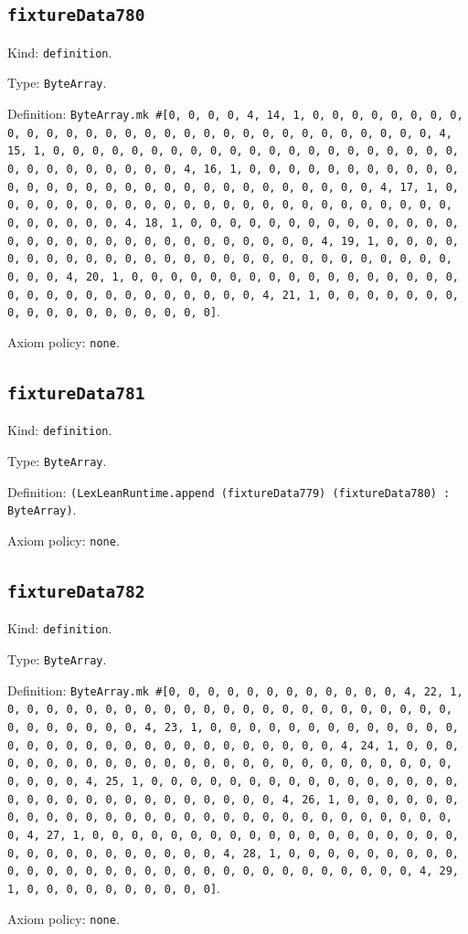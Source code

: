 \documentclass[11pt]{article}
\begin{document}
\subsection*{\texttt{fixtureData780}}
\noindent Kind: \texttt{definition}.\par
\noindent Type: \texttt{ByteArray}.\par
\noindent Definition: \texttt{ByteArray.mk \#[0, 0, 0, 0, 4, 14, 1, 0, 0, 0, 0, 0, 0, 0, 0, 0, 0, 0, 0, 0, 0, 0, 0, 0, 0, 0, 0, 0, 0, 0, 0, 0, 0, 0, 0, 0, 0, 4, 15, 1, 0, 0, 0, 0, 0, 0, 0, 0, 0, 0, 0, 0, 0, 0, 0, 0, 0, 0, 0, 0, 0, 0, 0, 0, 0, 0, 0, 0, 0, 0, 4, 16, 1, 0, 0, 0, 0, 0, 0, 0, 0, 0, 0, 0, 0, 0, 0, 0, 0, 0, 0, 0, 0, 0, 0, 0, 0, 0, 0, 0, 0, 0, 0, 4, 17, 1, 0, 0, 0, 0, 0, 0, 0, 0, 0, 0, 0, 0, 0, 0, 0, 0, 0, 0, 0, 0, 0, 0, 0, 0, 0, 0, 0, 0, 0, 0, 4, 18, 1, 0, 0, 0, 0, 0, 0, 0, 0, 0, 0, 0, 0, 0, 0, 0, 0, 0, 0, 0, 0, 0, 0, 0, 0, 0, 0, 0, 0, 0, 0, 4, 19, 1, 0, 0, 0, 0, 0, 0, 0, 0, 0, 0, 0, 0, 0, 0, 0, 0, 0, 0, 0, 0, 0, 0, 0, 0, 0, 0, 0, 0, 0, 0, 4, 20, 1, 0, 0, 0, 0, 0, 0, 0, 0, 0, 0, 0, 0, 0, 0, 0, 0, 0, 0, 0, 0, 0, 0, 0, 0, 0, 0, 0, 0, 0, 0, 4, 21, 1, 0, 0, 0, 0, 0, 0, 0, 0, 0, 0, 0, 0, 0, 0, 0, 0, 0, 0]}.\par
\noindent Axiom policy: \texttt{none}.\par
\subsection*{\texttt{fixtureData781}}
\noindent Kind: \texttt{definition}.\par
\noindent Type: \texttt{ByteArray}.\par
\noindent Definition: \texttt{(LexLeanRuntime.append (fixtureData779) (fixtureData780) : ByteArray)}.\par
\noindent Axiom policy: \texttt{none}.\par
\subsection*{\texttt{fixtureData782}}
\noindent Kind: \texttt{definition}.\par
\noindent Type: \texttt{ByteArray}.\par
\noindent Definition: \texttt{ByteArray.mk \#[0, 0, 0, 0, 0, 0, 0, 0, 0, 0, 0, 0, 4, 22, 1, 0, 0, 0, 0, 0, 0, 0, 0, 0, 0, 0, 0, 0, 0, 0, 0, 0, 0, 0, 0, 0, 0, 0, 0, 0, 0, 0, 0, 0, 0, 4, 23, 1, 0, 0, 0, 0, 0, 0, 0, 0, 0, 0, 0, 0, 0, 0, 0, 0, 0, 0, 0, 0, 0, 0, 0, 0, 0, 0, 0, 0, 0, 0, 4, 24, 1, 0, 0, 0, 0, 0, 0, 0, 0, 0, 0, 0, 0, 0, 0, 0, 0, 0, 0, 0, 0, 0, 0, 0, 0, 0, 0, 0, 0, 0, 0, 4, 25, 1, 0, 0, 0, 0, 0, 0, 0, 0, 0, 0, 0, 0, 0, 0, 0, 0, 0, 0, 0, 0, 0, 0, 0, 0, 0, 0, 0, 0, 0, 0, 4, 26, 1, 0, 0, 0, 0, 0, 0, 0, 0, 0, 0, 0, 0, 0, 0, 0, 0, 0, 0, 0, 0, 0, 0, 0, 0, 0, 0, 0, 0, 0, 0, 4, 27, 1, 0, 0, 0, 0, 0, 0, 0, 0, 0, 0, 0, 0, 0, 0, 0, 0, 0, 0, 0, 0, 0, 0, 0, 0, 0, 0, 0, 0, 0, 0, 4, 28, 1, 0, 0, 0, 0, 0, 0, 0, 0, 0, 0, 0, 0, 0, 0, 0, 0, 0, 0, 0, 0, 0, 0, 0, 0, 0, 0, 0, 0, 0, 0, 4, 29, 1, 0, 0, 0, 0, 0, 0, 0, 0, 0, 0]}.\par
\noindent Axiom policy: \texttt{none}.\par
\end{document}
